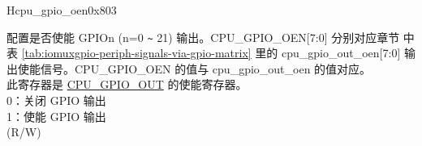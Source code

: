 \begin{register}{H}{cpu\_gpio\_oen}{0x803}\label{regdesc:GPIO_OEN}
%
%
%
%
%
%
%
%
%
\regnewline%
\begin{regdesc}\begin{reglist}
\label{fielddesc:GPIO_OEN}\item [CPU\_GPIO\_OEN] 配置是否使能 GPIOn (n=0 \verb+~+ 21) 输出。CPU\_GPIO\_OEN[7:0] 分别对应章节 \textit{} 中表 \ref{tab:iomuxgpio-periph-signals-via-gpio-matrix} 里的 cpu\_gpio\_out\_oen[7:0] 输出使能信号。CPU\_GPIO\_OEN 的值与 cpu\_gpio\_out\_oen 的值对应。\\
此寄存器是 \hyperref[fielddesc:GPIO_OUT]{CPU\_GPIO\_OUT} 的使能寄存器。\\
0：关闭 GPIO 输出\\
1：使能 GPIO 输出\\
(R/W)
\end{reglist}\end{regdesc}
\end{register}

